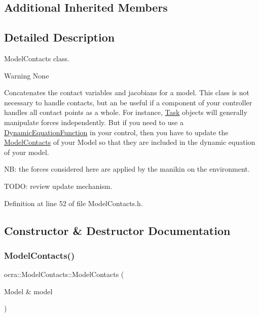 \subsection*{Additional Inherited Members}


\subsection{Detailed Description}
Model\+Contacts class. 

\begin{DoxyWarning}{Warning}
None
\end{DoxyWarning}
Concatenates the contact variables and jacobians for a model. This class is not necessary to handle contacts, but an be useful if a component of your controller handles all contact points as a whole. For instance, \hyperlink{classocra_1_1Task}{Task} objects will generally manipulate forces independently. But if you need to use a \hyperlink{classocra_1_1DynamicEquationFunction}{Dynamic\+Equation\+Function} in your control, then you have to update the \hyperlink{classocra_1_1ModelContacts}{Model\+Contacts} of your Model so that they are included in the dynamic equation of your model.

NB\+: the forces considered here are applied by the manikin on the environment.

T\+O\+DO\+: review update mechanism. 

Definition at line 52 of file Model\+Contacts.\+h.



\subsection{Constructor \& Destructor Documentation}
\hypertarget{classocra_1_1ModelContacts_abf9089d7762205480b46005544883e60}{}\label{classocra_1_1ModelContacts_abf9089d7762205480b46005544883e60} 
\subsubsection{\texorpdfstring{Model\+Contacts()}{ModelContacts()}}
{\footnotesize\ttfamily ocra\+::\+Model\+Contacts\+::\+Model\+Contacts (\begin{DoxyParamCaption}\item[{Model \&}]{model }\end{DoxyParamCaption})}



